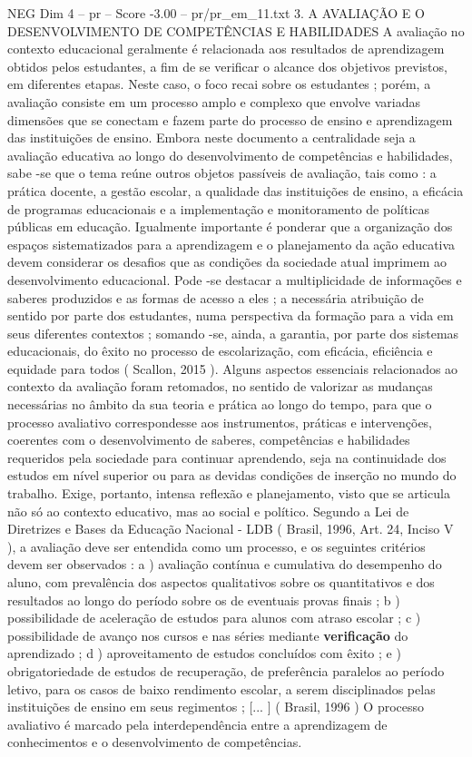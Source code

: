 \begin{textsample}{NEG Dim 4 – pr – Score -3.00 – pr/pr\_em\_11.txt}  \label{ex:f4_neg_105}
3.
A AVALIAÇÃO E O DESENVOLVIMENTO DE COMPETÊNCIAS E HABILIDADES A avaliação no contexto educacional geralmente é relacionada aos resultados de aprendizagem obtidos pelos estudantes, a fim de se verificar o alcance dos objetivos previstos, em diferentes etapas.
Neste caso, o foco recai sobre os estudantes ; porém, a avaliação consiste em um processo amplo e complexo que envolve variadas dimensões que se conectam e fazem parte do processo de ensino e aprendizagem das instituições de ensino.
Embora neste documento a centralidade seja a avaliação educativa ao longo do desenvolvimento de competências e habilidades, sabe -se que o tema reúne outros objetos passíveis de avaliação, tais como : a prática docente, a gestão escolar, a qualidade das instituições de ensino, a eficácia de programas educacionais e a implementação e monitoramento de políticas públicas em educação.
Igualmente importante é ponderar que a organização dos espaços sistematizados para a aprendizagem e o planejamento da ação educativa devem considerar os desafios que as condições da sociedade atual imprimem ao desenvolvimento educacional.
Pode -se destacar a multiplicidade de informações e saberes produzidos e as formas de acesso a eles ; a necessária atribuição de sentido por parte dos estudantes, numa perspectiva da formação para a vida em seus diferentes contextos ; somando -se, ainda, a garantia, por parte dos sistemas educacionais, do êxito no processo de escolarização, com eficácia, eficiência e equidade para todos ( Scallon, 2015 ).
Alguns aspectos essenciais relacionados ao contexto da avaliação foram retomados, no sentido de valorizar as mudanças necessárias no âmbito da sua teoria e prática ao longo do tempo, para que o processo avaliativo correspondesse aos instrumentos, práticas e intervenções, coerentes com o desenvolvimento de saberes, competências e habilidades requeridos pela sociedade para continuar aprendendo, seja na continuidade dos estudos em nível superior ou para as devidas condições de inserção no mundo do trabalho.
Exige, portanto, intensa reflexão e planejamento, visto que se articula não só ao contexto educativo, mas ao social e político.
Segundo a Lei de Diretrizes e Bases da Educação Nacional - LDB ( Brasil, 1996, Art. 24, Inciso V ), a avaliação deve ser entendida como um processo, e os seguintes critérios devem ser observados : a ) avaliação contínua e cumulativa do desempenho do aluno, com prevalência dos aspectos qualitativos sobre os quantitativos e dos resultados ao longo do período sobre os de eventuais provas finais ; b ) possibilidade de aceleração de estudos para alunos com atraso escolar ; c ) possibilidade de avanço nos cursos e nas séries mediante \textbf{verificação} do aprendizado ; d ) aproveitamento de estudos concluídos com êxito ; e ) obrigatoriedade de estudos de recuperação, de preferência paralelos ao período letivo, para os casos de baixo rendimento escolar, a serem disciplinados pelas instituições de ensino em seus regimentos ; [... ] ( Brasil, 1996 ) O processo avaliativo é marcado pela interdependência entre a aprendizagem de conhecimentos e o desenvolvimento de competências.

\end{textsample}
